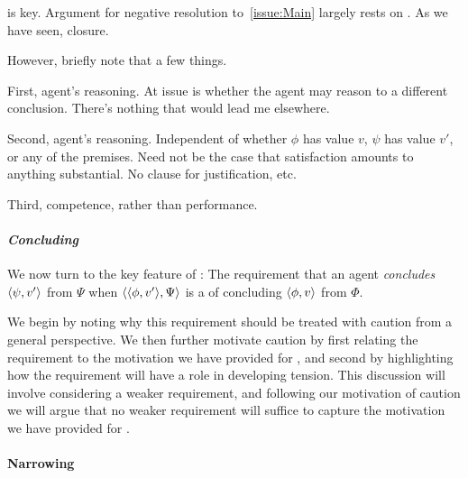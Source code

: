 \begin{note}
  \iZS{} is key.
  Argument for negative resolution to~\autoref{issue:Main} largely rests on \iZS{}.
  As we have seen, closure.

  However, briefly note that a few things.

  First, agent's reasoning.
  At issue is whether the agent may reason to a different conclusion.
  There's nothing that would lead me elsewhere.

  Second, agent's reasoning.
  Independent of whether \(\phi\) has value \(v\), \(\psi\) has value \(v'\), or any of the premises.
  Need not be the case that satisfaction amounts to anything substantial.
  No clause for justification, etc.

  Third, competence, rather than performance.
\end{note}

\paragraph*{\emph{Concluding}}

\begin{note}
  We now turn to the key feature of \iZS{}:
  The requirement that an agent \emph{concludes} \(\langle \psi, v' \rangle\) from \(\Psi\) when \(\langle \langle \phi, v' \rangle, \Psi \rangle\) is a \requ{} of concluding \(\langle \phi, v \rangle\) from \(\Phi\).

  We begin by noting why this requirement should be treated with caution from a general perspective.
  We then further motivate caution by first relating the requirement to the motivation we have provided for \csN{}, and second by highlighting how the requirement will have a role in developing tension.
  This discussion will involve considering a weaker requirement, and following our motivation of caution we will argue that no weaker requirement will suffice to capture the motivation we have provided for \csN{}.
\end{note}

\paragraph*{Narrowing }

